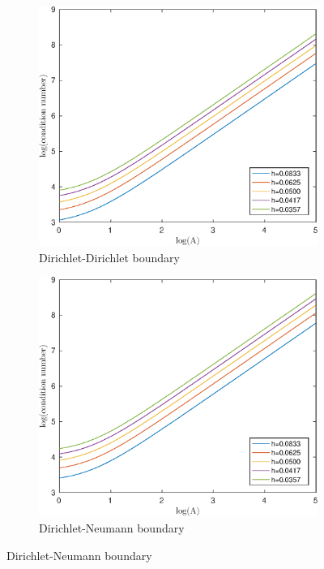 \documentclass[12pt]{article}
\begin{document}
\begin{figure}[h!]
\centering
\begin{subfigure}{0.4\textwidth}
\includegraphics[width=\textwidth]{cond-A-2D-circular-DD}
\caption{Dirichlet-Dirichlet boundary}
\end{subfigure}
\hfill
\begin{subfigure}{0.4\textwidth}
\includegraphics[width=\textwidth]{cond-A-2D-circular-DN}
\caption{Dirichlet-Neumann boundary}
\end{subfigure}

\end{figure}
\end{document}
